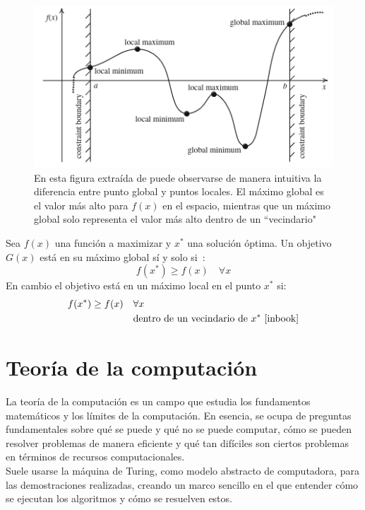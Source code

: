 \begin{figure}[H]
    \begin{center}
        \includegraphics[width=1\textwidth]{imagenes/min-max_points.png}
    \end{center}
    \caption[Puntos globales y locales]{En esta figura extraída de \cite{inbook} puede observarse de manera intuitiva la diferencia entre punto global y puntos locales. El máximo global es el valor más alto para $f(x)$ en el espacio, mientras que un máximo global solo representa el valor más alto dentro de un ``vecindario"}
\end{figure}

Sea $f(x)$ una función a maximizar y $x^*$ una solución óptima. Un objetivo $G(x)$ está en su máximo global sí y solo si~\cite{inbook}:
\begin{equation}
    f(x^*) \geq f(x) \quad \forall x
\end{equation}
En cambio el objetivo está en un máximo local en el punto $x^*$ si:
\begin{equation}
    \begin{split}
        f(x^*) \geq f(x) \quad & \forall x \\
        & \text{dentro de un vecindario de } x^*\text{~\cite{inbook}}
    \end{split}
\end{equation}

\section{Teoría de la computación}
La teoría de la computación es un campo que estudia los fundamentos matemáticos y los límites de la computación. En esencia, se ocupa de preguntas fundamentales sobre qué se puede y qué no se puede computar, cómo se pueden resolver problemas de manera eficiente y qué tan difíciles son ciertos problemas en términos de recursos computacionales.\\[6pt]
Suele usarse la máquina de Turing, como modelo abstracto de computadora, para las demostraciones realizadas, creando un marco sencillo en el que entender cómo se ejecutan los algoritmos y cómo se resuelven estos.
